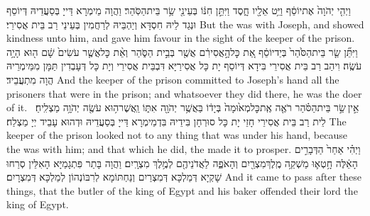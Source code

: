 {וַיְהִ֤י יְהֹוָה֙ אֶת\maqqaf יוֹסֵ֔ף וַיֵּ֥ט אֵלָ֖יו חָ֑סֶד וַיִּתֵּ֣ן חִנּ֔וֹ בְּעֵינֵ֖י שַׂ֥ר בֵּית\maqqaf הַסֹּֽהַר׃}
{וַהֲוָה מֵימְרָא דַּייָ בְּסַעֲדֵיהּ דְּיוֹסֵף וּנְגַד לֵיהּ חִסְדָּא וְיַהְבֵּיהּ לְרַחֲמִין בְּעֵינֵי רַב בֵּית אֲסִירֵי׃}
{But the \lord\space was with Joseph, and showed kindness unto him, and gave him favour in the sight of the keeper of the prison.}{}
{וַיִּתֵּ֞ן שַׂ֤ר בֵּית\maqqaf הַסֹּ֙הַר֙ בְּיַד\maqqaf יוֹסֵ֔ף אֵ֚ת כׇּל\maqqaf הָ֣אֲסִירִ֔ם אֲשֶׁ֖ר בְּבֵ֣ית הַסֹּ֑הַר וְאֵ֨ת כׇּל\maqqaf אֲשֶׁ֤ר עֹשִׂים֙ שָׁ֔ם ה֖וּא הָיָ֥ה עֹשֶֽׂה׃}
{וִיהַב רַב בֵּית אֲסִירֵי בִּידָא דְּיוֹסֵף יָת כָּל אֲסִירַיָּא דִּבְבֵּית אֲסִירֵי וְיָת כָּל דְּעָבְדִין תַּמָּן מִמֵּימְרֵיהּ הֲוָה מִתְעֲבֵיד׃}
{And the keeper of the prison committed to Joseph’s hand all the prisoners that were in the prison; and whatsoever they did there, he was the doer of it.}{}
{אֵ֣ין \legarmeh  שַׂ֣ר בֵּית\maqqaf הַסֹּ֗הַר רֹאֶ֤ה אֶֽת\maqqaf כׇּל\maqqaf מְא֙וּמָה֙ בְּיָד֔וֹ בַּאֲשֶׁ֥ר יְהֹוָ֖ה אִתּ֑וֹ וַֽאֲשֶׁר\maqqaf ה֥וּא עֹשֶׂ֖ה יְהֹוָ֥ה מַצְלִֽיחַ׃ \petucha }
{לֵית רַב בֵּית אֲסִירֵי חָזֵי יָת כָּל סוּרְחָן בִּידֵיהּ בִּדְמֵימְרָא דַּייָ בְּסַעֲדֵיהּ וּדְהוּא עָבֵיד יְיָ מַצְלַח׃}
{The keeper of the prison looked not to any thing that was under his hand, because the \lord\space was with him; and that which he did, the \lord\space made it to prosper.}{}
\newperek
{}%
{וַיְהִ֗י אַחַר֙ הַדְּבָרִ֣ים הָאֵ֔לֶּה חָ֥טְא֛וּ מַשְׁקֵ֥ה מֶֽלֶךְ\maqqaf מִצְרַ֖יִם וְהָאֹפֶ֑ה לַאֲדֹנֵיהֶ֖ם לְמֶ֥לֶךְ מִצְרָֽיִם׃}
{וַהֲוָה בָּתַר פִּתְגָמַיָּא הָאִלֵּין סְרַחוּ שָׁקְיָא דְּמַלְכָּא דְּמִצְרַיִם וְנַחְתּוֹמָא לְרִבּוֹנְהוֹן לְמַלְכָּא דְּמִצְרָיִם׃}
{And it came to pass after these things, that the butler of the king of Egypt and his baker offended their lord the king of Egypt.}{}
